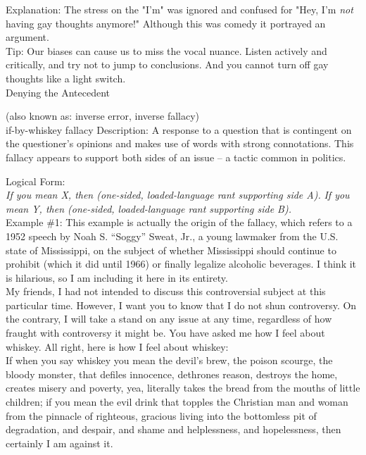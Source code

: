 \documentclass[a4paper,12pt,single,pdftex]{scrartcl}
\begin{document}
    
      Explanation: The stress on the "I'm" was ignored and confused for "Hey, I'm {\it not} having gay thoughts anymore!" Although this was comedy it portrayed an argument.
    \\

    
      Tip: Our biases can cause us to miss the vocal nuance. Listen actively and critically, and try not to jump to conclusions. And you cannot turn off gay thoughts like a light switch.
    \\

  

Denying the Antecedent
    
      (also known as: inverse error, inverse fallacy)
    \\

  

if-by-whiskey fallacy
    Description: A response to a question that is contingent on the questioner’s opinions and makes use of words with strong connotations.  This fallacy appears to support both sides of an issue -- a tactic common in politics.

    
      Logical Form:
    \\

    
      {\em If you mean X, then (one-sided, loaded-language rant supporting side A).} \newline
{\em If you mean Y, then (one-sided, loaded-language rant supporting side B).}
    \\

    
      Example \#1: This example is actually the origin of the fallacy, which refers to a 1952 speech by Noah S. “Soggy” Sweat, Jr., a young lawmaker from the U.S. state of Mississippi, on the subject of whether Mississippi should continue to prohibit (which it did until 1966) or finally legalize alcoholic beverages.  I think it is hilarious, so I am including it here in its entirety.
    \\

    
      My friends, I had not intended to discuss this controversial subject at this particular time. However, I want you to know that I do not shun controversy. On the contrary, I will take a stand on any issue at any time, regardless of how fraught with controversy it might be. You have asked me how I feel about whiskey. All right, here is how I feel about whiskey:
    \\

    
      If when you say whiskey you mean the devil’s brew, the poison scourge, the bloody monster, that defiles innocence, dethrones reason, destroys the home, creates misery and poverty, yea, literally takes the bread from the mouths of little children; if you mean the evil drink that topples the Christian man and woman from the pinnacle of righteous, gracious living into the bottomless pit of degradation, and despair, and shame and helplessness, and hopelessness, then certainly I am against it.
    \\
\end{document}
